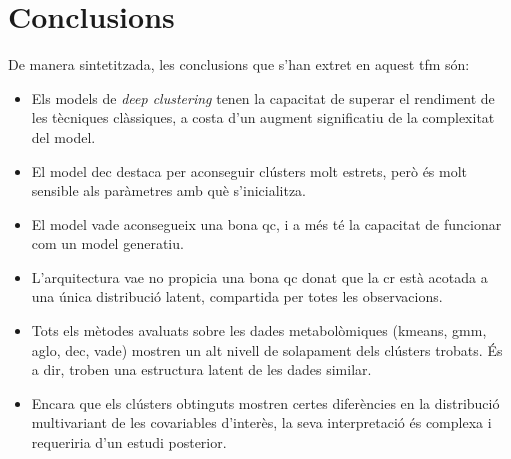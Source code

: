 \documentclass[CAT,BIB]{TFUOC}%
\begin{document}
    \section{Conclusions}
    \label{s:conclusions}

        De manera sintetitzada,
        les conclusions que s'han extret en aquest \gls{tfm} són:

        \begin{itemize}
            \item Els models de \textit{deep clustering}
            tenen la capacitat de superar el rendiment de les tècniques clàssiques,
            a costa d'un augment significatiu de la complexitat del model.

            \item El model \gls{dec} destaca per aconseguir clústers molt estrets,
            però és molt sensible als paràmetres amb què s'inicialitza.

            \item El model \gls{vade} aconsegueix una bona \gls{qc},
            i a més té la capacitat de funcionar com un model generatiu.

            \item L'arquitectura \gls{vae} no propicia una bona \gls{qc}
            donat que la \gls{cr} està acotada a una única distribució latent,
            compartida per totes les observacions.

            \item Tots els mètodes avaluats sobre les dades metabolòmiques
            (\gls{kmeans}, \gls{gmm}, \gls{aglo}, \gls{dec}, \gls{vade})
            mostren un alt nivell de solapament dels clústers trobats.
            És a dir, troben una estructura latent de les dades similar.

            \item Encara que els clústers obtinguts
            mostren certes diferències en la distribució multivariant
            de les covariables d'interès,
            la seva interpretació és complexa
            i requeriria d'un estudi posterior.
        \end{itemize}
\end{document}
